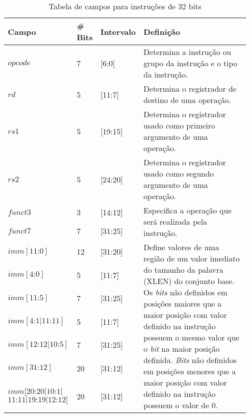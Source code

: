   
  \begin{table}
  \begin{tabular}{ |p{0.2\linewidth}|p{0.08\linewidth}|p{0.12\linewidth}|p{0.58\linewidth}| } 
    \hline
    Campo & {\#} Bits & Intervalo & Definição \\ \hline \hline
    $opcode$ & 7 & [6:0] & Determina a instrução ou grupo da instrução e o tipo da instrução. \\ \hline
    $rd$ & 5 & [11:7] & Determina o registrador de destino de uma operação. \\ \hline
    $rs1$ & 5 & [19:15] & Determina o registrador usado como primeiro argumento de uma operação. \\ \hline
    $rs2$ & 5 & [24:20] & Determina o registrador usado como segundo argumento de uma operação. \\ \hline
    $funct3$ & 3 & [14:12] & \multirow{2}{1\linewidth}{Especifica a operação que será realizada pela instrução.}\\
    $funct7$ & 7 & [31:25] & \\ \hline
    $imm[11\text{:}0]$ & 12 & [31:20] & 
    \multirow{7}{1.0\linewidth}{Define valores de uma região de um valor imediato do tamanho da palavra 
    (XLEN) do conjunto base. Os \emph{bits} não definidos em posições maiores que a maior posição com 
    valor definido na instrução possuem o mesmo valor que o \emph{bit} na maior posição definida. 
    \emph{Bits} não definidos em posições menores que a maior posição com valor definido na instrução 
    possuem o valor de 0.} \\
    $imm[4\text{:}0]$ & 5 & [11:7] & \\
    $imm[11\text{:}5]$ & 7 & [31:25] & \\
    $imm[4\text{:}1|11\text{:}11]$ & 5 & [11:7] & \\
    $imm[12\text{:}12|10\text{:}5]$ & 7 & [31:25] & \\
    $imm[31\text{:}12]$ & 20 & [31:12] & \\
    $imm[20\text{:}20|10\text{:}1|$ $11\text{:}11|19\text{:}19|12\text{:}12]$ & 20 & [31:12] & \\
    \hline 
  
  \end{tabular}
  \caption{Tabela de campos para instruções de 32 bits\label{tab:if32}}
  \end{table}


